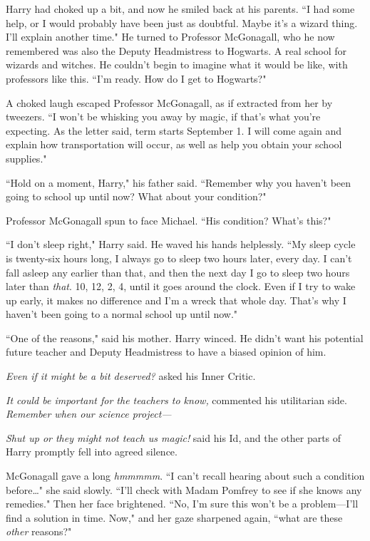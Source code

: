 Harry had choked up a bit, and now he smiled back at his parents. ``I had some help, or I would probably have been just as doubtful. Maybe it's a wizard thing. I'll explain another time." He turned to Professor McGonagall, who he now remembered was also the Deputy Headmistress to Hogwarts. A real school for wizards and witches. He couldn't begin to imagine what it would be like, with professors like this. ``I'm ready. How do I get to Hogwarts?"

A choked laugh escaped Professor McGonagall, as if extracted from her by tweezers. ``I won't be whisking you away by magic, if that's what you're expecting. As the letter said, term starts September 1. I will come again and explain how transportation will occur, as well as help you obtain your school supplies."

``Hold on a moment, Harry," his father said. ``Remember why you haven't been going to school up until now? What about your condition?"

Professor McGonagall spun to face Michael. ``His condition? What's this?"

``I don't sleep right," Harry said. He waved his hands helplessly. ``My sleep cycle is twenty-six hours long, I always go to sleep two hours later, every day. I can't fall asleep any earlier than that, and then the next day I go to sleep two hours later than \emph{that}. 10\pm, 12\am, 2\am, 4\am, until it goes around the clock. Even if I try to wake up early, it makes no difference and I'm a wreck that whole day. That's why I haven't been going to a normal school up until now."

``One of the reasons," said his mother. Harry winced. He didn't want his potential future teacher and Deputy Headmistress to have a biased opinion of him.

\emph{Even if it might be a bit deserved?} asked his Inner Critic.

\emph{It could be important for the teachers to know,} commented his utilitarian side. \emph{Remember when our science project---}

\emph{Shut up or they might not teach us magic!} said his Id, and the other parts of Harry promptly fell into agreed silence.

McGonagall gave a long \emph{hmmmmm}. ``I can't recall hearing about such a condition before{\ldots}" she said slowly. ``I'll check with Madam Pomfrey to see if she knows any remedies." Then her face brightened. ``No, I'm sure this won't be a problem---I'll find a solution in time. Now," and her gaze sharpened again, ``what are these \emph{other} reasons?"

